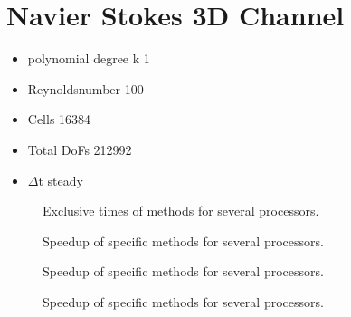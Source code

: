 \documentclass{article}
\begin{document}
\section*{Navier Stokes 3D Channel}
\begin{itemize}
	\large \item  polynomial degree k 1
	\item Reynoldsnumber 100
	\item Cells 16384
	\item Total DoFs 212992
	\item $\Delta$t steady
\end{itemize}
	\begin{figure}
		\hspace{-2cm}
		\rule{0cm}{1.1cm}
		\caption{Exclusive times of methods for several processors.}
	\end{figure}
	\begin{figure}
		\hspace{-2cm}
		\rule{0cm}{1.1cm}
		\caption{Speedup of specific methods for several processors.}
	\end{figure}
		\begin{figure}
		\hspace{-2cm}
		\rule{0cm}{1.1cm}
		\caption{Speedup of specific methods for several processors.}
		\end{figure}
		\begin{figure}
			\hspace{-2cm}
			\rule{0cm}{1.1cm}
			\caption{Speedup of specific methods for several processors.}
		\end{figure}
\end{document}
